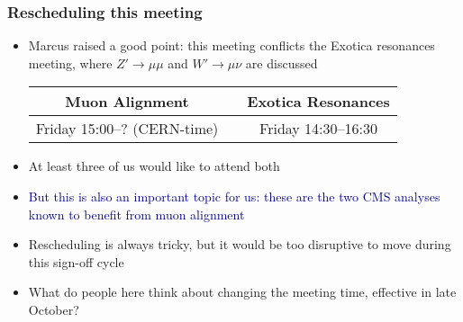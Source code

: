 \documentclass[compress]{beamer}
\begin{document}
\begin{frame}
\frametitle{Rescheduling this meeting}
\begin{itemize}\setlength{\itemsep}{0.3 cm}
\item Marcus raised a good point: this meeting conflicts the Exotica
  resonances meeting, where $Z' \to \mu\mu$ and $W' \to \mu\nu$ are
  discussed
\begin{center}
\renewcommand{\arraystretch}{1.3}
\begin{tabular}{c p{0.5 cm} c}
Muon Alignment & & Exotica Resonances \\\hline
Friday 15:00--? (CERN-time) & & Friday 14:30--16:30
\end{tabular}
\end{center}

\item At least three of us would like to attend both

\item \textcolor{darkblue}{But this is also an important topic for us:
  these are the two CMS analyses known to benefit from muon alignment}

\item Rescheduling is always tricky, but it would be too disruptive to
  move during this sign-off cycle

\item What do people here think about changing the meeting time,
  effective in late October?
\end{itemize}
\label{numpages}
\end{frame}



\end{document}
